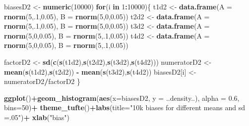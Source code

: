 \documentclass[10pt,dvipsnames,enabledeprecatedfontcommands]{scrartcl}
\newenvironment{Shaded}{\begin{snugshade}}{\end{snugshade}}
\newcommand{\KeywordTok}[1]{\textcolor[rgb]{0.13,0.29,0.53}{\textbf{#1}}}
\newcommand{\DataTypeTok}[1]{\textcolor[rgb]{0.13,0.29,0.53}{#1}}
\newcommand{\DecValTok}[1]{\textcolor[rgb]{0.00,0.00,0.81}{#1}}
\newcommand{\FloatTok}[1]{\textcolor[rgb]{0.00,0.00,0.81}{#1}}
\newcommand{\StringTok}[1]{\textcolor[rgb]{0.31,0.60,0.02}{#1}}
\newcommand{\ControlFlowTok}[1]{\textcolor[rgb]{0.13,0.29,0.53}{\textbf{#1}}}
\newcommand{\OperatorTok}[1]{\textcolor[rgb]{0.81,0.36,0.00}{\textbf{#1}}}
\newcommand{\NormalTok}[1]{#1}
\begin{document}
\begin{Shaded}
\begin{Highlighting}[]
\NormalTok{biasesD2 <-}\StringTok{ }\KeywordTok{numeric}\NormalTok{(}\DecValTok{10000}\NormalTok{)}
\ControlFlowTok{for}\NormalTok{(i }\ControlFlowTok{in} \DecValTok{1}\OperatorTok{:}\DecValTok{10000}\NormalTok{)\{}
\NormalTok{t1d2 <-}\StringTok{ }\KeywordTok{data.frame}\NormalTok{(}\DataTypeTok{A  =} \KeywordTok{rnorm}\NormalTok{(}\DecValTok{5}\NormalTok{,.}\DecValTok{1}\NormalTok{,}\FloatTok{0.05}\NormalTok{), }\DataTypeTok{B =} \KeywordTok{rnorm}\NormalTok{(}\DecValTok{5}\NormalTok{,}\DecValTok{0}\NormalTok{,}\FloatTok{0.05}\NormalTok{))}
\NormalTok{t2d2 <-}\StringTok{ }\KeywordTok{data.frame}\NormalTok{(}\DataTypeTok{A  =} \KeywordTok{rnorm}\NormalTok{(}\DecValTok{5}\NormalTok{,.}\DecValTok{1}\NormalTok{,}\FloatTok{0.05}\NormalTok{), }\DataTypeTok{B =} \KeywordTok{rnorm}\NormalTok{(}\DecValTok{5}\NormalTok{,}\DecValTok{0}\NormalTok{,}\FloatTok{0.05}\NormalTok{))}
\NormalTok{t3d2 <-}\StringTok{ }\KeywordTok{data.frame}\NormalTok{(}\DataTypeTok{A  =} \KeywordTok{rnorm}\NormalTok{(}\DecValTok{5}\NormalTok{,}\DecValTok{0}\NormalTok{,}\FloatTok{0.05}\NormalTok{), }\DataTypeTok{B =} \KeywordTok{rnorm}\NormalTok{(}\DecValTok{5}\NormalTok{,.}\DecValTok{1}\NormalTok{,}\FloatTok{0.05}\NormalTok{))}
\NormalTok{t4d2 <-}\StringTok{ }\KeywordTok{data.frame}\NormalTok{(}\DataTypeTok{A  =} \KeywordTok{rnorm}\NormalTok{(}\DecValTok{5}\NormalTok{,}\DecValTok{0}\NormalTok{,}\FloatTok{0.05}\NormalTok{), }\DataTypeTok{B =} \KeywordTok{rnorm}\NormalTok{(}\DecValTok{5}\NormalTok{,.}\DecValTok{1}\NormalTok{,}\FloatTok{0.05}\NormalTok{))}

\NormalTok{factorD2 <-}\StringTok{ }\KeywordTok{sd}\NormalTok{(}\KeywordTok{c}\NormalTok{(}\KeywordTok{s}\NormalTok{(t1d2),}\KeywordTok{s}\NormalTok{(t2d2),}\KeywordTok{s}\NormalTok{(t3d2),}\KeywordTok{s}\NormalTok{(t4d2)))}
\NormalTok{numeratorD2 <-}\StringTok{  }\KeywordTok{mean}\NormalTok{(}\KeywordTok{s}\NormalTok{(t1d2),}\KeywordTok{s}\NormalTok{(t2d2)) }\OperatorTok{-}\StringTok{ }\KeywordTok{mean}\NormalTok{(}\KeywordTok{s}\NormalTok{(t3d2),}\KeywordTok{s}\NormalTok{(t4d2))}
\NormalTok{biasesD2[i] <-}\StringTok{ }\NormalTok{numeratorD2}\OperatorTok{/}\NormalTok{factorD2}
\NormalTok{\}}

\KeywordTok{ggplot}\NormalTok{()}\OperatorTok{+}\KeywordTok{geom_histogram}\NormalTok{(}\KeywordTok{aes}\NormalTok{(}\DataTypeTok{x=}\NormalTok{biasesD2, }\DataTypeTok{y =}\NormalTok{ ..density..), }\DataTypeTok{alpha =} \FloatTok{0.6}\NormalTok{, }\DataTypeTok{bins=}\DecValTok{50}\NormalTok{)}\OperatorTok{+}
\StringTok{  }\KeywordTok{theme_tufte}\NormalTok{()}\OperatorTok{+}\KeywordTok{labs}\NormalTok{(}\DataTypeTok{title=}\StringTok{"10k biases for different means and sd =.05"}\NormalTok{)}\OperatorTok{+}\StringTok{ }\KeywordTok{xlab}\NormalTok{(}\StringTok{"bias"}\NormalTok{)}
\end{Highlighting}
\end{Shaded}
\end{document}

